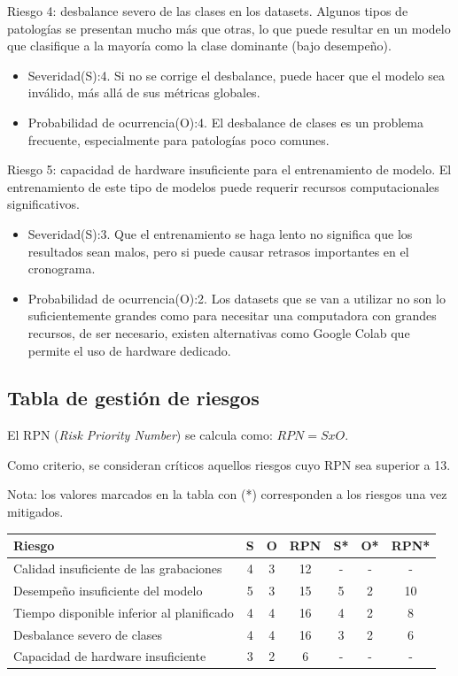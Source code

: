 \documentclass[
11pt, %
]{charter}
\begin{document}
Riesgo 4: desbalance severo de las clases en los datasets. Algunos tipos de patologías se presentan mucho más que otras, lo que puede resultar en un modelo
que clasifique a la mayoría como la clase dominante (bajo desempeño).
\begin{itemize}
  \item Severidad(S):4. Si no se corrige el desbalance, puede hacer que el modelo sea inválido, más allá de sus métricas globales.
  \item Probabilidad de ocurrencia(O):4. El desbalance de clases es un problema frecuente, especialmente para patologías poco comunes.
\end{itemize}

Riesgo 5: capacidad de hardware insuficiente para el entrenamiento de modelo. El entrenamiento de este tipo de modelos puede requerir recursos
computacionales significativos.
\begin{itemize}
  \item Severidad(S):3. Que el entrenamiento se haga lento no significa que los resultados sean malos, pero si puede causar retrasos importantes
  en el cronograma.
  \item Probabilidad de ocurrencia(O):2. Los datasets que se van a utilizar no son lo suficientemente grandes como para necesitar una computadora
  con grandes recursos, de ser necesario, existen alternativas como Google Colab que permite el uso de hardware dedicado.
\end{itemize}

\subsection{Tabla de gestión de riesgos}

El RPN (\textit{Risk Priority Number}) se calcula como: $RPN = SxO$. 

Como criterio, se consideran críticos aquellos riesgos cuyo RPN sea superior a 13.

Nota: los valores marcados en la tabla con (*) corresponden a los riesgos una vez mitigados.

\begin{table}[htpb]
\centering
\begin{tabularx}{\linewidth}{@{}|X|c|c|c|c|c|c|@{}}
\hline
\rowcolor[HTML]{C0C0C0} 
Riesgo & S & O & RPN & S* & O* & RPN* \\ \hline
Calidad insuficiente de las grabaciones & 4 & 3 & 12 & - & - & - \\ \hline
Desempeño insuficiente del modelo & 5 & 3 & 15 & 5 & 2 & 10 \\ \hline
Tiempo disponible inferior al planificado & 4 & 4 & 16 & 4 & 2 & 8 \\ \hline
Desbalance severo de clases & 4 & 4 & 16 & 3 & 2 & 6 \\ \hline
Capacidad de hardware insuficiente & 3 & 2 & 6 & - & - & - \\ \hline
\end{tabularx}%
\end{table}
\end{document}
